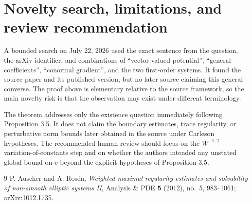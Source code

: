 \documentclass[11pt]{article}
\begin{document}
\section{Novelty search, limitations, and review recommendation}

A bounded search on July 22, 2026 used the exact sentence from the question, the arXiv identifier, and combinations of ``vector-valued potential'', ``general coefficients'', ``conormal gradient'', and the two first-order systems. It found the source paper and its published version, but no later source claiming this general converse. The proof above is elementary relative to the source framework, so the main novelty risk is that the observation may exist under different terminology.

The theorem addresses only the existence question immediately following Proposition 3.5. It does not claim the boundary estimates, trace regularity, or perturbative norm bounds later obtained in the source under Carleson hypotheses. The recommended human review should focus on the $W^{-1,2}$ variation-of-constants step and on whether the authors intended any unstated global bound on $v$ beyond the explicit hypotheses of Proposition 3.5.

\begin{thebibliography}{9}
P. Auscher and A. Ros\'en,
\emph{Weighted maximal regularity estimates and solvability of non-smooth elliptic systems II},
Analysis \& PDE \textbf{5} (2012), no.~5, 983--1061;
arXiv:1012.1735.
\end{thebibliography}
\endgroup
\end{document}
